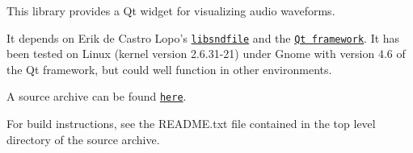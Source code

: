 This library provides a Qt widget for visualizing audio waveforms.\par
\par
 It depends on Erik de Castro Lopo's \href{http://www.mega-nerd.com/libsndfile/}{\tt libsndfile} and the \href{http://qt.nokia.com/}{\tt Qt framework}. It has been tested on Linux (kernel version 2.6.31-\/21) under Gnome with version 4.6 of the Qt framework, but could well function in other environments. \par
\par
 A source archive can be found \href{http://www.columbia.edu/~naz2106/WaveformWidget.tar.gz}{\tt here}. \par
\par
For build instructions, see the README.txt file contained in the top level directory of the source archive. 